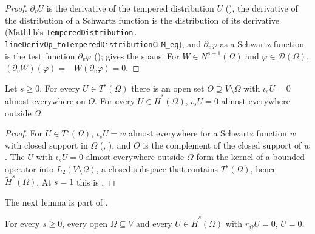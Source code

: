 \begin{proof}
\leanok
$\partial_v U$ is the derivative of the tempered distribution $U$
(), the derivative of the distribution of a Schwartz function is
the distribution of its derivative (Mathlib's \texttt{TemperedDistribution.\allowbreak
lineDerivOp\_\allowbreak toTemperedDistributionCLM\_\allowbreak eq}), and $\partial_v \varphi$ as a
Schwartz function is the test function $\partial_v \varphi$
();  gives the
spans. For $W \in N^{s+1}(\Omega)$ and $\varphi \in \mathcal D(\Omega)$,
$(\partial_v W)(\varphi) = -W(\partial_v \varphi) = 0$.
\end{proof}

\begin{lemma}
\label{lem:tilde-space-vanishes-outside-nonneg}
\leanok
{}
Let $s \geq 0$. For every $U \in T^s(\Omega)$ there is an open set $O \supseteq V \setminus
\Omega$ with $\iota_s U = 0$ almost everywhere on $O$. For every $U \in \tilde H^s(\Omega)$,
$\iota_s U = 0$ almost everywhere outside $\Omega$.
\end{lemma}

\begin{proof}
\leanok
For $U \in T^s(\Omega)$, $\iota_s U = w$ almost everywhere for a Schwartz function $w$ with
closed support in $\Omega$ (, ), and
$O$ is the complement of the closed support of $w$. The $U$ with $\iota_s U = 0$ almost
everywhere outside $\Omega$ form the kernel of a bounded operator into $L_2(V \setminus \Omega)$,
a closed subspace that contains $T^s(\Omega)$, hence $\tilde H^s(\Omega)$. At $s = 1$ this is
.
\end{proof}

The next lemma is part of \cite[Lemma 2.2(iii)]{HewettMoiola}.

\begin{lemma}
\label{lem:tilde-restriction-injective}
\leanok
{}
For every $s \geq 0$, every open $\Omega \subseteq V$ and every $U \in \tilde H^s(\Omega)$ with
$r_\Omega U = 0$, $U = 0$.
\end{lemma}

